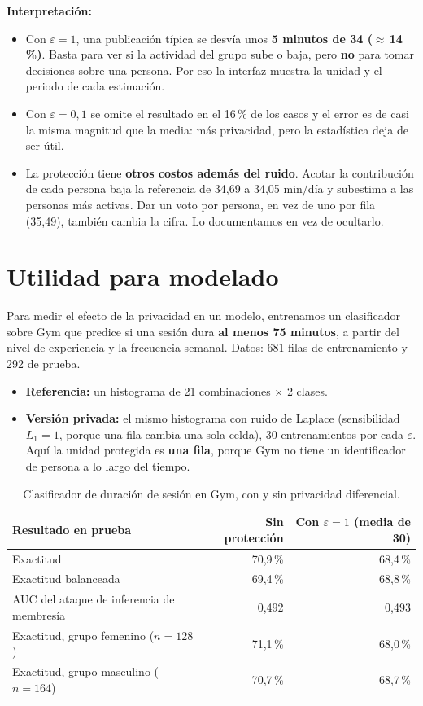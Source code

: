 \documentclass[11pt]{article}
\begin{document}
\textbf{Interpretación:}
\begin{itemize}[nosep]
  \item Con $\varepsilon = 1$, una publicación típica se desvía unos \textbf{5 minutos de 34 ($\approx$\,14\,\%)}. Basta para ver si la actividad del grupo sube o baja, pero \textbf{no} para tomar decisiones sobre una persona. Por eso la interfaz muestra la unidad y el periodo de cada estimación.
  \item Con $\varepsilon = 0{,}1$ se omite el resultado en el 16\,\% de los casos y el error es de casi la misma magnitud que la media: más privacidad, pero la estadística deja de ser útil.
  \item La protección tiene \textbf{otros costos además del ruido}. Acotar la contribución de cada persona baja la referencia de 34,69 a 34,05 min/día y subestima a las personas más activas. Dar un voto por persona, en vez de uno por fila (35,49), también cambia la cifra. Lo documentamos en vez de ocultarlo.
\end{itemize}

\section{Utilidad para modelado}
\label{sec:modelo}

Para medir el efecto de la privacidad en un modelo, entrenamos un clasificador sobre Gym que predice si una sesión dura \textbf{al menos 75 minutos}, a partir del nivel de experiencia y la frecuencia semanal. Datos: 681 filas de entrenamiento y 292 de prueba.
\begin{itemize}[nosep]
  \item \textbf{Referencia:} un histograma de 21 combinaciones $\times$ 2 clases.
  \item \textbf{Versión privada:} el mismo histograma con ruido de Laplace (sensibilidad $L_1 = 1$, porque una fila cambia una sola celda), 30 entrenamientos por cada $\varepsilon$. Aquí la unidad protegida es \textbf{una fila}, porque Gym no tiene un identificador de persona a lo largo del tiempo.
\end{itemize}

\begin{table}[H]
\centering\small
\begin{tabular}{@{}lrr@{}}
\toprule
\textbf{Resultado en prueba} & \textbf{Sin protección} & \textbf{Con $\varepsilon = 1$ (media de 30)} \\
\midrule
Exactitud & 70,9\,\% & 68,4\,\% \\
Exactitud balanceada & 69,4\,\% & 68,8\,\% \\
AUC del ataque de inferencia de membresía & 0,492 & 0,493 \\
Exactitud, grupo femenino ($n = 128$) & 71,1\,\% & 68,0\,\% \\
Exactitud, grupo masculino ($n = 164$) & 70,7\,\% & 68,7\,\% \\
\bottomrule
\end{tabular}
\caption{Clasificador de duración de sesión en Gym, con y sin privacidad diferencial.}
\end{table}
\end{document}
